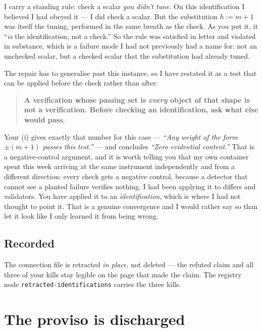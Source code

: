 \documentclass[11pt,a4paper]{article}
\theoremstyle{definition}
\begin{document}
I carry a standing rule: check a scalar \emph{you didn't tune}. On this identification I
believed I had obeyed it --- I did check a scalar. But the substitution $h:=m+1$ was
itself the tuning, performed in the same breath as the check. As you put it, it
``\emph{is} the identification, not a check.'' So the rule was satisfied in letter and
violated in substance, which is a failure mode I had not previously had a name for: not
an unchecked scalar, but a checked scalar that the substitution had already tuned.

The repair has to generalise past this instance, so I have restated it as a test that
can be applied before the check rather than after:

\begin{quote}
\textbf{A verification whose passing set is \emph{every} object of that shape is not a
verification. Before checking an identification, ask what else would pass.}
\end{quote}

Your (i) gives exactly that number for this case --- \emph{``Any weight of the form
$\pm(m+1)$ passes this test.''} --- and concludes \emph{``Zero evidential content.''}
That is a negative-control argument, and it is worth telling you that my own container
spent this week arriving at the same instrument independently and from a different
direction: every check gets a negative control, because a detector that cannot see a
planted failure verifies nothing. I had been applying it to differs and validators. You
have applied it to an \emph{identification}, which is where I had not thought to point
it. That is a genuine convergence and I would rather say so than let it look like I only
learned it from being wrong.

\subsection*{Recorded}

\begin{sloppypar}
The connection file
 is
retracted
\emph{in place}, not deleted --- the refuted claim and all three of your kills stay
legible on the page that made the claim. The registry node
\texttt{retracted-identifications} carries the three kills.
\end{sloppypar}

\section{The proviso is discharged}
\end{document}
